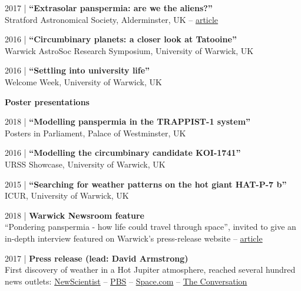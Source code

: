 \documentclass[10pt,a4paper]{altacv}
\begin{document}
\smallskip

\small 2017 | \textbf{``Extrasolar panspermia: are we the aliens?''} \\
Stratford Astronomical Society, Alderminster, UK -- \href{http://www.astro.org.uk/news/nov17/}{article}

\smallskip

\small 2016 | \textbf{``Circumbinary planets: a closer look at Tatooine''} \\
Warwick AstroSoc Research Symposium, University of Warwick, UK

\smallskip

\small 2016 | \textbf{``Settling into university life''} \\
Welcome Week, University of Warwick, UK

\divider

\normalsize \textbf{Poster presentations}

\medskip

\small 2018 | \textbf{``Modelling panspermia in the TRAPPIST-1 system''} \\
Posters in Parliament, Palace of Westminster, UK

\smallskip

\small 2016 | \textbf{``Modelling the circumbinary candidate KOI-1741''} \\
URSS Showcase, University of Warwick, UK

\smallskip

\small 2015 | \textbf{``Searching for weather patterns on the hot giant HAT-P-7 b''} \\
ICUR, University of Warwick, UK

\medskip


\medskip

\small 2018 | \textbf{Warwick Newsroom feature} \\
``Pondering panspermia - how life could travel through space'', invited to give an in-depth interview featured on Warwick's press-release website -- \href{https://warwick.ac.uk/newsandevents/knowledgecentre/science/physics-astrophysics/panspermia}{article}

\divider

\small 2017 | \textbf{Press release (lead: David Armstrong)} \\
First discovery of weather in a Hot Jupiter atmosphere, reached several hundred news outlets: \href{https://www.newscientist.com/article/2115792-first-exoplanet-weather-report-shows-clouds-of-ruby-and-sapphire/}{NewScientist} -- \href{https://www.pbs.org/newshour/science/heres-first-weather-report-exoplanet}{PBS} -- \href{https://www.space.com/34992-giant-alien-planet-ruby-clouds-weather.html}{Space.com} --
\href{https://theconversation.com/how-we-caught-the-first-glimpse-of-weather-on-a-faraway-gas-giant-70229}{The Conversation}
\end{document}
